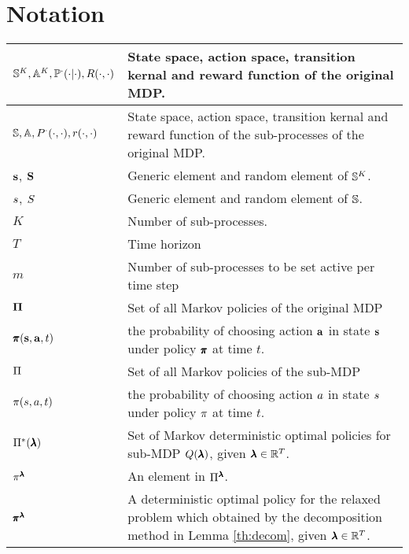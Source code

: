 \section{Notation}\label{ap:notations}
\begin{centering}
\begin{longtable}{| p{} | p{} |}
\hline
$\mathbb{S}^K,\mathbb{A}^K,\mathbb{P}^{\cdot}(\cdot|\cdot),R(\cdot,\cdot)$  & State space, action space, transition kernal and reward function of the original MDP.\\ 
\hline
$\mathbb{S},\mathbb{A},P^{\cdot}(\cdot,\cdot),r(\cdot,\cdot)$& State space, action space, transition kernal and reward function of the sub-processes of the original MDP.\\ 
\hline
$\mathbf{s}$, $\mathbf{S}$ & Generic element and random element of $\mathbb{S}^K$.\\ %
\hline
$s$, $S$ & Generic element and random element of $\mathbb{S}$. \\%
\hline
$K$ & Number of sub-processes.\\ 
\hline
$T$& Time horizon\\ 
\hline
$m$& Number of sub-processes to be set active per time step\\ 
\hline
$\mathbf{\Pi}$& Set of all Markov policies of the original MDP\\ 
\hline
$\pmb{\pi}(\mathbf{s},\mathbf{a},t)$ & the probability of choosing action $\mathbf{a}$ in state $\mathbf{s}$ under policy $\pmb{\pi}$ at time $t$.\\
\hline
$\Pi$& Set of all Markov policies of the sub-MDP\\ 
\hline
$\pi(s,a,t)$ & the probability of choosing action $a$ in state $s$ under policy $\pi$ at time $t$.\\
\hline
$\Pi^*(\pmb{\lambda})$& Set of Markov deterministic optimal policies for sub-MDP $Q(\pmb{\lambda})$, given $\pmb{\lambda}\in\mathbb{R}^{T}$.\\
\hline
$\pi^{\pmb{\lambda}}$& An element in $\Pi^{\pmb{\lambda}}$.\\
\hline
$\pmb{\pi}^{\pmb{\lambda}}$& A deterministic optimal policy for the relaxed problem which obtained by the decomposition method in Lemma \ref{th:decom}, given $\pmb{\lambda}\in\mathbb{R}^{T}$.\\

\end{longtable}
\end{centering}
